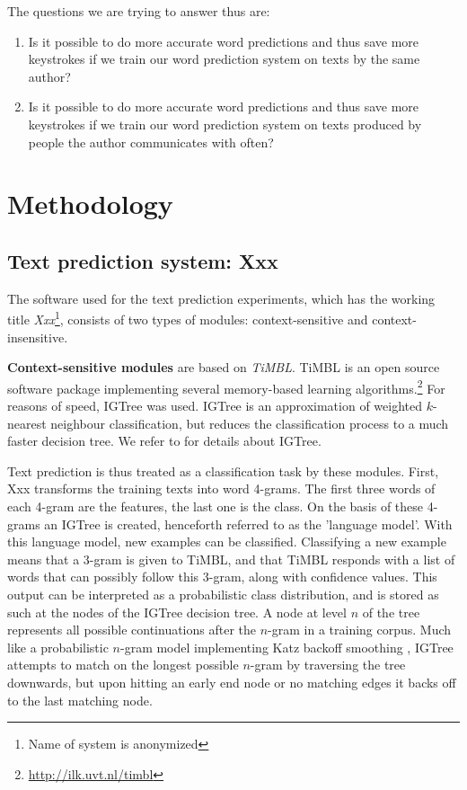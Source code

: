 \documentclass[11pt]{article}
\begin{document}
The questions we are trying to answer thus are:

\begin{enumerate}
\item Is it possible to do more accurate word predictions and thus save more keystrokes if we train our word prediction system on texts by the same author?
\item Is it possible to do more accurate word predictions and thus save more keystrokes if we train our word prediction system on texts produced by people the author communicates with often?
\end{enumerate}

\section{Methodology}

\subsection{Text prediction system: Xxx}

The software used for the text prediction experiments, which has the working title \emph{Xxx}\footnote{Name of system is anonymized}, consists of two types of modules: context-sensitive and context-insensitive. 

\textbf{Context-sensitive modules} are based on \emph{TiMBL}. TiMBL is an open source software package implementing several memory-based learning algorithms.\footnote{\url{http://ilk.uvt.nl/timbl}} For reasons of speed, IGTree was used. IGTree is an approximation of weighted $k$-nearest neighbour classification, but reduces the classification process to a much faster decision tree. We refer to  for details about IGTree.

Text prediction is thus treated as a classification task by these modules. First, Xxx transforms the training texts into word 4-grams. The first three words of each 4-gram are the features, the last one is the class. On the basis of these 4-grams an IGTree is created, henceforth referred to as the 'language model'. With this language model, new examples can be classified. Classifying a new example means that a 3-gram is given to TiMBL, and that TiMBL responds with a list of words that can possibly follow this 3-gram, along with confidence values. This output can be interpreted as a probabilistic class distribution, and is stored as such at the nodes of the IGTree decision tree. A node at level $n$ of the tree represents all possible continuations after the $n$-gram in a training corpus. Much like a probabilistic $n$-gram model implementing Katz backoff smoothing \cite{katz87}, IGTree attempts to match on the longest possible $n$-gram by traversing the tree downwards, but upon hitting an early end node or no matching edges it backs off to the last matching node.
\end{document}
